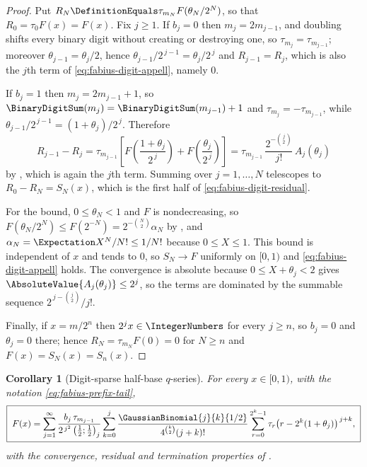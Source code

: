 \documentclass[11pt,a4paper,oneside,openany]{book}
\newtheorem{corollary}[corollary]{Corollary}
\theoremstyle{definition}
\theoremstyle{remark}
\begin{document}
\begin{proof}
Put $R_N\DefinitionEquals\tau_{m_N}F(\theta_N/2^N)$, so that $R_0=\tau_0F(x)=F(x)$.  Fix
$j\ge1$.  If $b_j=0$ then $m_j=2m_{j-1}$, and doubling shifts every binary digit
without creating or destroying one, so $\tau_{m_j}=\tau_{m_{j-1}}$; moreover
$\theta_{j-1}=\theta_j/2$, hence
$\theta_{j-1}/2^{\,j-1}=\theta_j/2^{\,j}$ and $R_{j-1}=R_j$, which is also the
$j$th term of \eqref{eq:fabius-digit-appell}, namely $0$.

If $b_j=1$ then $m_j=2m_{j-1}+1$, so $\BinaryDigitSum(m_j)=\BinaryDigitSum(m_{j-1})+1$ and
$\tau_{m_j}=-\tau_{m_{j-1}}$, while
$\theta_{j-1}/2^{\,j-1}=(1+\theta_j)/2^{\,j}$.  Therefore
\[
 R_{j-1}-R_j
 =\tau_{m_{j-1}}\left[
   F\!\left(\frac{1+\theta_j}{2^{\,j}}\right)
  +F\!\left(\frac{\theta_j}{2^{\,j}}\right)\right]
 =\tau_{m_{j-1}}\,\frac{2^{-\binom j2}}{j!}\,A_j(\theta_j)
\]
by , which is again the $j$th term.  Summing
over $j=1,\ldots,N$ telescopes to $R_0-R_N=S_N(x)$, which is the first half of
\eqref{eq:fabius-digit-residual}.

For the bound, $0\le\theta_N<1$ and $F$ is nondecreasing, so
$F(\theta_N/2^N)\le F(2^{-N})=2^{-\binom N2}\alpha_N$ by
, and $\alpha_N=\Expectation X^N/N!\le1/N!$ because
$0\le X\le1$.  This bound is independent of $x$ and tends to $0$, so
$S_N\to F$ uniformly on $[0,1)$ and \eqref{eq:fabius-digit-appell} holds.  The
convergence is absolute because $0\le X+\theta_j<2$ gives
$\AbsoluteValue{A_j(\theta_j)}\le2^j$, so the terms are dominated by the summable sequence
$2^{\,j-\binom j2}/j!$.

Finally, if $x=m/2^n$ then $2^jx\in\IntegerNumbers$ for every $j\ge n$, so $b_j=0$ and
$\theta_j=0$ there; hence $R_N=\tau_{m_N}F(0)=0$ for $N\ge n$ and
$F(x)=S_N(x)=S_n(x)$.
\end{proof}

\begin{corollary}[Digit-sparse half-base $q$-series]\label{cor:fabius-digit-qseries}
For every $x\in[0,1)$, with the notation \eqref{eq:fabius-prefix-tail},
\begin{equation}\label{eq:fabius-digit-qseries}
 \boxed{\;
 F(x)=\sum_{j=1}^{\infty}
 \frac{b_j\,\tau_{m_{j-1}}}
      {2^{\,j^2}\left(\frac12;\frac12\right)_j}
 \sum_{k=0}^{j}\frac{\GaussianBinomial{j}{k}{1/2}}{4^{\binom k2}(j+k)!}
 \sum_{r=0}^{2^k-1}\tau_r
 \bigl(r-2^k(1+\theta_j)\bigr)^{\,j+k},\;}
\end{equation}
with the convergence, residual and termination properties of
.
\end{corollary}
\end{document}
